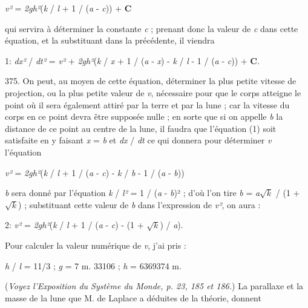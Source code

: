 \documentclass[a4paper, 11pt, oneside, polutonikogreek, french]{article}
\begin{document}
\begin{center}
\emph{v²} = \emph{2gh²}(\emph{k} / \emph{l} + 1 / (\emph{a} - \emph{c})) + \textbf{C}
\end{center}

qui servira à déterminer la constante \emph{c} ; prenant donc la valeur de \emph{c} dans cette équation, et la substituant dans la précédente, il viendra

\begin{center}
1: \emph{dx²} / \emph{dt²} = \emph{v²} + \emph{2gh²}(\emph{k} / \emph{x} + 1 / (\emph{a} - \emph{x}) - \emph{k} / \emph{l} - 1 / (\emph{a} - \emph{c})) + \textbf{C}.
\end{center}

375. On peut, au moyen de cette équation, déterminer la plus petite vitesse de projection, ou la plus petite valeur de \emph{v}, nécessaire pour que le corps atteigne le point où il sera également attiré par la terre et par la lune ; car la vitesse du corps en ce point devra être supposée nulle ; en sorte que si on appelle \emph{b} la distance de ce point au centre de la lune, il faudra que l'équation (1) soit satisfaite en y faisant \emph{x} = \emph{b} et \emph{dx} / \emph{dt} ce qui donnera pour déterminer \emph{v} l'équation

\begin{center}
\emph{v²} = \emph{2gh²}(\emph{k} / \emph{l} + 1 / (\emph{a} - \emph{c}) - \emph{k} / \emph{b} - 1 / (\emph{a} - \emph{b}))
\end{center}

\emph{b} sera donné par l'équation \emph{k} / \emph{l²} = 1 / (\emph{a} - \emph{b})² ; d'où l'on tire \emph{b} = \emph{a}$\sqrt{k}$ / (1 + $\sqrt{k}$) ; substituant cette valeur de \emph{b} dans l'expression de \emph{v²}, on aura :

\begin{center}
2: \emph{v²} = \emph{2gh²}(\emph{k} / \emph{l} + 1 / (\emph{a} - \emph{c}) - (1 + $\sqrt{k}$) / \emph{a}).
\end{center}

Pour calculer la valeur numérique de \emph{v}, j'ai pris :

\begin{center}
\emph{h} / \emph{l} = 11/3 ; \emph{g} = 7 m. 33106 ; \emph{h} = 6369374 m.
\end{center}

(\emph{Voyez l'Exposition du Système du Monde, p. 23, 185 et 186.}) La parallaxe et la masse de la lune que M. de Laplace a déduites de la théorie, donnent
\end{document}
